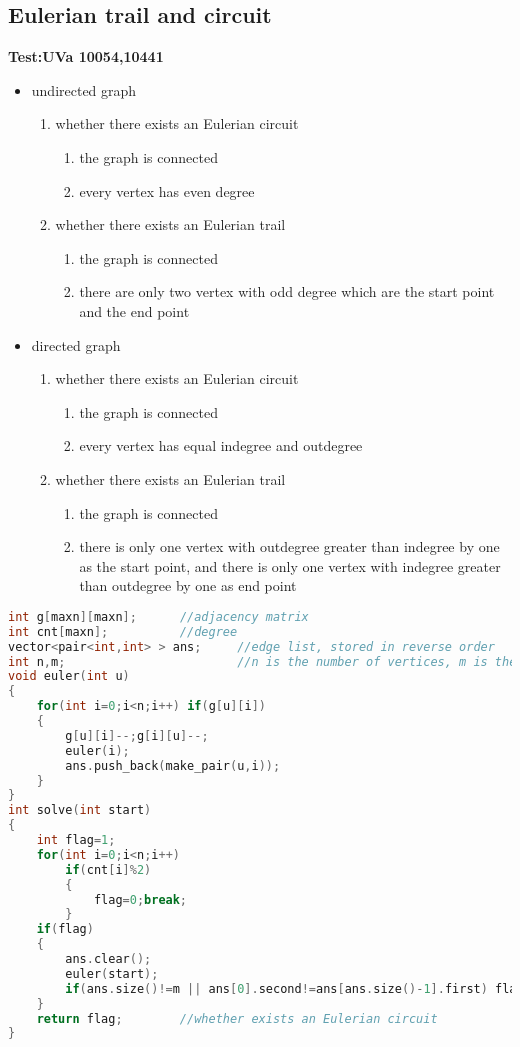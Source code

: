   \subsection{Eulerian trail and circuit}
  \textbf{Test:UVa 10054,10441}
  \begin{itemize}
   \item undirected graph
   \begin{enumerate}
    \item whether there exists an Eulerian circuit
    \begin{enumerate}
	\item the graph is connected
	\item every vertex has even degree
    \end{enumerate}
    \item whether there exists an Eulerian trail
    \begin{enumerate}
	\item the graph is connected
	\item there are only two vertex with odd degree which are the start point and the end point
    \end{enumerate}
   \end{enumerate}
   \item directed graph
   \begin{enumerate}
    \item whether there exists an Eulerian circuit
    \begin{enumerate}
	\item the graph is connected
	\item every vertex has equal indegree and outdegree
    \end{enumerate}
    \item whether there exists an Eulerian trail
    \begin{enumerate}
	\item the graph is connected
	\item there is only one vertex with outdegree greater than indegree by one as the start point, and there is only one vertex with indegree greater than outdegree by one as end point
    \end{enumerate}
   \end{enumerate}
  \end{itemize}
  \begin{lstlisting}[language=C++]
int g[maxn][maxn];      //adjacency matrix
int cnt[maxn];          //degree
vector<pair<int,int> > ans;     //edge list, stored in reverse order
int n,m;                        //n is the number of vertices, m is the number of edges
void euler(int u)
{
    for(int i=0;i<n;i++) if(g[u][i])
    {
        g[u][i]--;g[i][u]--;
        euler(i);
        ans.push_back(make_pair(u,i));
    }
}
int solve(int start)
{
    int flag=1;
    for(int i=0;i<n;i++)
        if(cnt[i]%2)
        {
            flag=0;break;
        }
    if(flag)
    {
        ans.clear();
        euler(start);
        if(ans.size()!=m || ans[0].second!=ans[ans.size()-1].first) flag=0;
    }
    return flag;        //whether exists an Eulerian circuit
}
  \end{lstlisting}




